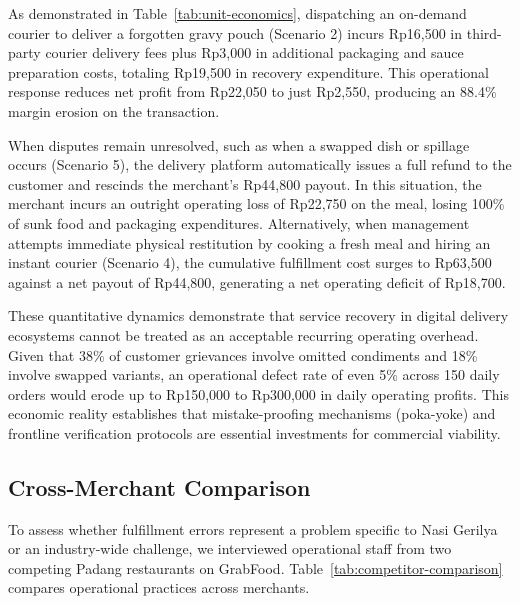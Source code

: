 \documentclass{jomas}
\begin{document}
As demonstrated in Table~\ref{tab:unit-economics}, dispatching an on-demand courier to deliver a forgotten gravy pouch (Scenario 2) incurs Rp16,500 in third-party courier delivery fees plus Rp3,000 in additional packaging and sauce preparation costs, totaling Rp19,500 in recovery expenditure. This operational response reduces net profit from Rp22,050 to just Rp2,550, producing an 88.4\% margin erosion on the transaction. 

When disputes remain unresolved, such as when a swapped dish or spillage occurs (Scenario 5), the delivery platform automatically issues a full refund to the customer and rescinds the merchant's Rp44,800 payout. In this situation, the merchant incurs an outright operating loss of Rp22,750 on the meal, losing 100\% of sunk food and packaging expenditures. Alternatively, when management attempts immediate physical restitution by cooking a fresh meal and hiring an instant courier (Scenario 4), the cumulative fulfillment cost surges to Rp63,500 against a net payout of Rp44,800, generating a net operating deficit of Rp18,700. 

These quantitative dynamics demonstrate that service recovery in digital delivery ecosystems cannot be treated as an acceptable recurring operating overhead. Given that 38\% of customer grievances involve omitted condiments and 18\% involve swapped variants, an operational defect rate of even 5\% across 150 daily orders would erode up to Rp150,000 to Rp300,000 in daily operating profits. This economic reality establishes that mistake-proofing mechanisms (poka-yoke) and frontline verification protocols are essential investments for commercial viability.

\subsection{Cross-Merchant Comparison}
To assess whether fulfillment errors represent a problem specific to Nasi Gerilya or an industry-wide challenge, we interviewed operational staff from two competing Padang restaurants on GrabFood. Table~\ref{tab:competitor-comparison} compares operational practices across merchants.
\end{document}
